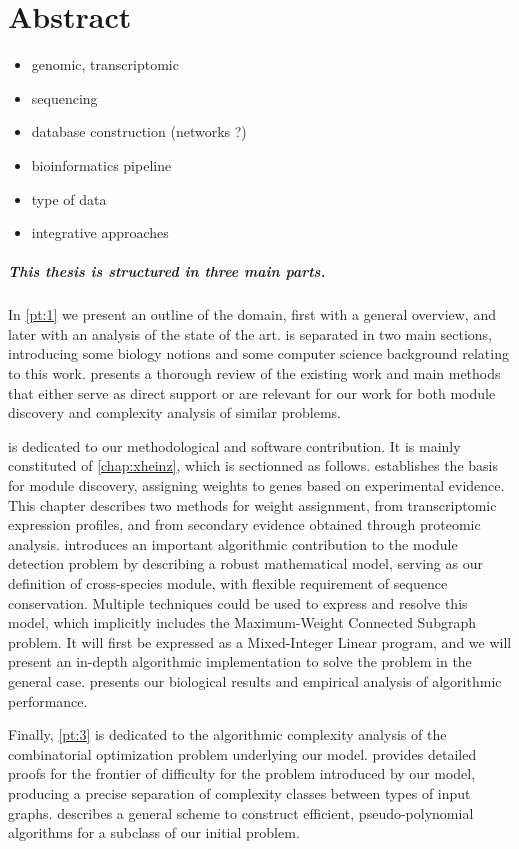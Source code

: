\chapter*{Abstract}
\label{chap:abstract}

	\begin{itemize}
		\item genomic, transcriptomic
		\item sequencing
		\item database construction (networks ?)

		\item bioinformatics pipeline
		\item type of data
		\item integrative approaches
	\end{itemize}

\paragraph*{This thesis is structured in three main parts.}


In \cref{pt:1} we present an outline of the domain, first with a general overview, and later with an analysis of the state of the art.
 is separated in two main sections, introducing some biology notions and some computer science background relating to this work.
 presents a thorough review of the existing work and main methods that either serve as direct support or are relevant for our work for both module discovery and complexity analysis of similar problems.

 is dedicated to our methodological and software contribution. It is mainly constituted of \cref{chap:xheinz}, which is sectionned as follows.
 establishes the basis for module discovery, assigning weights to genes based on experimental evidence.
This chapter describes two methods for weight assignment, from transcriptomic expression profiles, and from secondary evidence obtained through proteomic analysis.
 introduces an important algorithmic contribution to the module detection problem by describing a robust mathematical model, serving as our definition of cross-species module, with flexible requirement of sequence conservation.
Multiple techniques could be used to express and resolve this model, which implicitly includes the Maximum-Weight Connected Subgraph problem.
It will first be expressed as a Mixed-Integer Linear program, and we will present an in-depth algorithmic implementation to solve the problem in the general case.
 presents our biological results and empirical analysis of algorithmic performance.

Finally, \cref{pt:3} is dedicated to the algorithmic complexity analysis of the combinatorial optimization problem underlying our model.
 provides detailed proofs for the frontier of difficulty for the problem introduced by our model, producing a precise separation of complexity classes between types of input graphs.
 describes a general scheme to construct efficient, pseudo-polynomial algorithms for a subclass of our initial problem.
